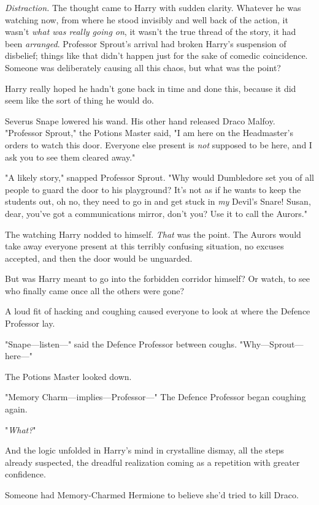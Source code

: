 \emph{Distraction.} The thought came to Harry with sudden clarity. Whatever he
was watching now, from where he stood invisibly and well back of the action, it
wasn't \emph{what was really going on}, it wasn't the true thread of the story,
it had been \emph{arranged}. Professor Sprout's arrival had broken Harry's
suspension of disbelief; things like that didn't happen just for the sake of
comedic coincidence. Someone was deliberately causing all this chaos, but what
was the point?

Harry really hoped he hadn't gone back in time and done this, because it did
seem like the sort of thing he would do.

Severus Snape lowered his wand. His other hand released Draco Malfoy.
"Professor Sprout," the Potions Master said, "I am here on the Headmaster's
orders to watch this door. Everyone else present is \emph{not} supposed to be
here, and I ask you to see them cleared away."

"A likely story," snapped Professor Sprout. "Why would Dumbledore set you of
all people to guard the door to his playground? It's not as if he wants to keep
the students out, oh no, they need to go in and get stuck in \emph{my} Devil's
Snare! Susan, dear, you've got a communications mirror, don't you? Use it to
call the Aurors."

The watching Harry nodded to himself. \emph{That} was the point. The Aurors
would take away everyone present at this terribly confusing situation, no
excuses accepted, and then the door would be unguarded.

But was Harry meant to go into the forbidden corridor himself? Or watch, to see
who finally came once all the others were gone?

A loud fit of hacking and coughing caused everyone to look at where the Defence
Professor lay.

"Snape—listen—" said the Defence Professor between coughs.
"Why—Sprout—here—"

The Potions Master looked down.

"Memory Charm—implies—Professor—" The Defence Professor began coughing
again.

"\emph{What?}"

And the logic unfolded in Harry's mind in crystalline dismay, all the steps
already suspected, the dreadful realization coming as a repetition with greater
confidence.

Someone had Memory-Charmed Hermione to believe she'd tried to kill Draco.

